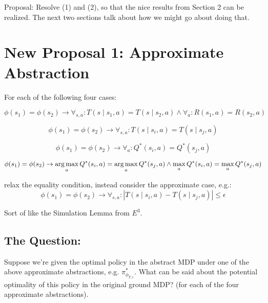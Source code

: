 \documentclass[11pt]{amsart}
\begin{document}
Proposal: Resolve (1) and (2), so that the nice results from Section 2 can be realized. The next two sections talk about how we might go about doing that.

\midline

\newpage
\section{New Proposal 1: Approximate Abstraction}

For each of the following four cases:

\begin{equation}
 \phi(s_1) = \phi(s_2) \rightarrow \forall_{s,a} : T(s \mid s_1, a) = T(s \mid s_2, a) \wedge \forall_a : R(s_1,a) = R(s_2,a)
\end{equation}

\begin{equation}
 \phi(s_1) = \phi(s_2) \rightarrow \forall_{s,a} : T(s \mid s_i, a) = T(s \mid s_j, a)
\end{equation}

\begin{equation}
 \phi(s_1) = \phi(s_2) \rightarrow \forall_a : Q^*(s_i, a) = Q^*(s_j, a)
\end{equation}

\begin{equation}
 \phi(s_1) = \phi(s_2) \rightarrow \operatorname*{arg\,max}_a Q^*(s_i, a) = \operatorname*{arg\,max}_a Q^*(s_j, a) \wedge \max_a Q^*(s_i, a) = \max_a Q^*(s_j, a)
\end{equation}



 relax the equality condition, instead consider the approximate case, e.g.:
\begin{equation}
 \phi(s_1) = \phi(s_2) \rightarrow \forall_{s,a} : |T(s \mid s_i, a) - T(s \mid s_j, a)| \leq \epsilon
\end{equation}

Sort of like the Simulation Lemma from $E^3$.

\subsection{The Question:} Suppose we're given the optimal policy in the abstract MDP under one of the above approximate abstractions, e.g. $\pi^*_{\phi_{T,\epsilon}}$. What can be said about the potential optimality of this policy in the original ground MDP? (for each of the four approximate abstractions).
\end{document}
